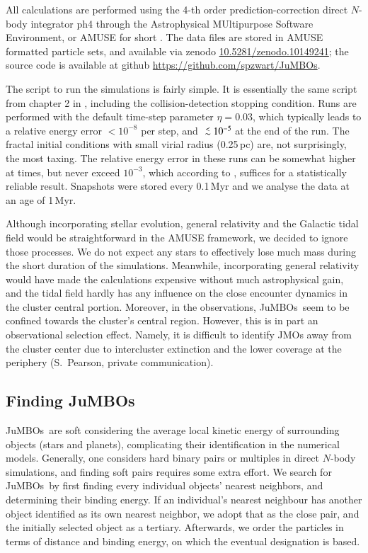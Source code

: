 \documentclass[submission,phys]{lib/SciPost}
\def\aplt{\ {\raise-.5ex\hbox{$\buildrel<\over\sim$}}\ }
\newcommand{\jumbos}{\mbox{JuMBOs}}
\begin{document}
All calculations are performed using the 4-th order prediction-correction
direct $N$-body integrator {\sc ph4} \cite{2022A&A...659A..86P}
through the Astrophysical MUltipurpose Software Environment, or AMUSE
for short
\cite{2013CoPhC.183..456P,2013AA...557A..84P,2018araa.book.....P}.
The data files are stored in {\sc AMUSE} formatted particle sets, and
available via zenodo \url{10.5281/zenodo.10149241}; the source
code is available at github \url{https://github.com/spzwart/JuMBOs}.

The script to run the simulations is fairly simple.  It is essentially
the same script from chapter 2 in \cite{2018araa.book.....P},
including the collision-detection stopping condition.  Runs are
performed with the default time-step parameter $\eta=0.03$, which
typically leads to a relative energy error $<10^{-8}$ per step, and
$\aplt 10^{-5}$ at the end of the run. The fractal initial conditions
with small virial radius (0.25\,pc) are, not surprisingly, the most
taxing.  The relative energy error in these runs can be somewhat
higher at times, but never exceed $10^{-3}$, which according to
\cite{2041-8205-785-1-L3}, suffices for a statistically reliable
result.  Snapshots were stored every 0.1\,Myr and we analyse the data
at an age of 1\,Myr.

Although incorporating stellar evolution, general relativity and the
Galactic tidal field would be straightforward in the AMUSE framework,
we decided to ignore those processes.  We do not expect any stars to
effectively lose much mass during the short duration of the
simulations. Meanwhile, incorporating general relativity would have
made the calculations expensive without much astrophysical gain, and
the tidal field hardly has any influence on the close encounter
dynamics in the cluster central portion.  Moreover, in the
observations, \jumbos\, seem to be confined towards the cluster's
central region.  However, this is in part an observational selection
effect. Namely, it is difficult to identify JMOs away from the cluster
center due to intercluster extinction and the lower coverage at the
periphery (S.\, Pearson, private communication).

\subsection{Finding \jumbos}

\jumbos\, are soft considering the average local kinetic energy of
surrounding objects (stars and planets), complicating their identification
in the numerical models.  Generally, one considers hard
binary pairs or multiples in direct $N$-body simulations, and finding
soft pairs requires some extra effort.  We search for \jumbos\,
by first finding every individual objects' nearest neighbors, 
and determining their binding energy. If an individual's nearest
neighbour has another object identified as its own nearest neighbor, we
adopt that as the close pair, and the initially selected object as
a tertiary. Afterwards, we order the particles in terms of distance and
binding energy, on which the eventual designation is based.
\end{document}
